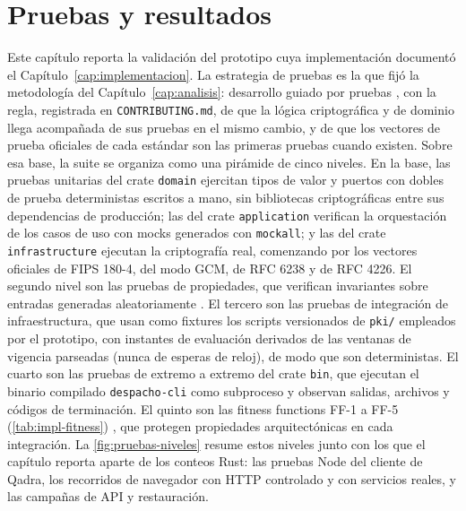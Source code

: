 
\chapter{Pruebas y resultados}\label{cap:pruebas}

Este capítulo reporta la validación del prototipo cuya implementación documentó el Capítulo~\ref{cap:implementacion}. La estrategia de pruebas es la que fijó la metodología del Capítulo~\ref{cap:analisis}: desarrollo guiado por pruebas \cite{beck2004}, con la regla, registrada en \texttt{CONTRIBUTING.md}, de que la lógica criptográfica y de dominio llega acompañada de sus pruebas en el mismo cambio, y de que los vectores de prueba oficiales de cada estándar son las primeras pruebas cuando existen. Sobre esa base, la suite se organiza como una pirámide de cinco niveles. En la base, las pruebas unitarias del crate \texttt{domain} ejercitan tipos de valor y puertos con dobles de prueba deterministas escritos a mano, sin bibliotecas criptográficas entre sus dependencias de producción; las del crate \texttt{application} verifican la orquestación de los casos de uso con mocks generados con \texttt{mockall}; y las del crate \texttt{infrastructure} ejecutan la criptografía real, comenzando por los vectores oficiales de FIPS 180-4, del modo GCM, de RFC 6238 y de RFC 4226. El segundo nivel son las pruebas de propiedades, que verifican invariantes sobre entradas generadas aleatoriamente \cite{claessen2000}. El tercero son las pruebas de integración de infraestructura, que usan como fixtures los scripts versionados de \texttt{pki/} empleados por el prototipo, con instantes de evaluación derivados de las ventanas de vigencia parseadas (nunca de esperas de reloj), de modo que son deterministas. El cuarto son las pruebas de extremo a extremo del crate \texttt{bin}, que ejecutan el binario compilado \texttt{despacho-cli} como subproceso y observan salidas, archivos y códigos de terminación. El quinto son las fitness functions FF-1 a FF-5 (\cref{tab:impl-fitness}) \cite{ford2023}, que protegen propiedades arquitectónicas en cada integración. La \cref{fig:pruebas-niveles} resume estos niveles junto con los que el capítulo reporta aparte de los conteos Rust: las pruebas Node del cliente de Qadra, los recorridos de navegador con HTTP controlado y con servicios reales, y las campañas de API y restauración.

